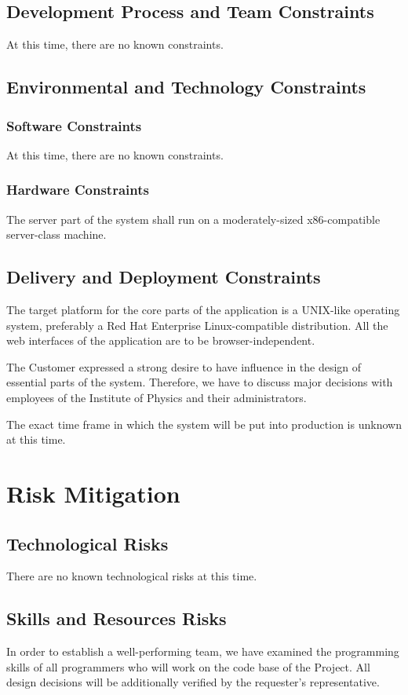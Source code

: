 \documentclass[12pt]{article}
\begin{document}
\subsection{Development Process and Team Constraints}
At this time, there are no known constraints.

\subsection{Environmental and Technology Constraints}

\subsubsection{Software Constraints}
At this time, there are no known constraints.

\subsubsection{Hardware Constraints}
The server part of the system shall run on a moderately-sized x86-compatible
server-class machine.

\subsection{Delivery and Deployment Constraints}
The target platform for the core parts of the application is a UNIX-like
operating system, preferably a Red Hat Enterprise Linux-compatible distribution.
All the web interfaces of the application are to be browser-independent.

The Customer expressed a strong desire to have influence in the design of
essential parts of the system.   Therefore, we have to discuss major decisions
with employees of the Institute of Physics and their administrators.

The exact time frame in which the system will be put into production is unknown
at this time.

\section{Risk Mitigation}

\subsection{Technological Risks}
There are no known technological risks at this time.

\subsection{Skills and Resources Risks}
In order to establish a well-performing team, we have examined the programming
skills of all programmers who will work on the code base of the Project.  All
design decisions will be additionally verified by the requester's
representative.
\end{document}
